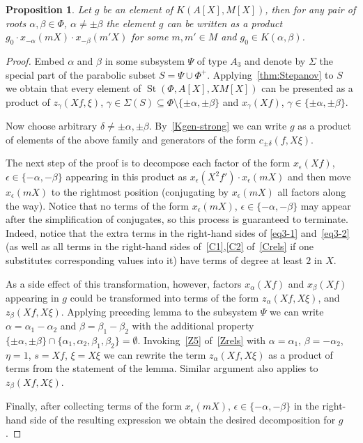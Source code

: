 \documentclass[oneside, 8pt]{amsart}
\newtheorem{prop}{Proposition}
\theoremstyle{remark}
\theoremstyle{definition}
\DeclareMathOperator{\St}{St}
\numberwithin{equation}{section}
\begin{document}
\begin{prop} \label{K-a-b}
 Let $g$ be an element of $K(A[X], M[X])$, then for any pair of roots $\alpha, \beta \in \Phi$, $\alpha \neq \pm \beta$
 the element $g$ can be written as a product $g_0 \cdot x_{-\alpha}(mX) \cdot x_{-\beta}(m'X)$ for some $m, m' \in M$ and $g_0 \in K(\alpha, \beta)$.
\end{prop}
\begin{proof}
 Embed $\alpha$ and $\beta$ in some subsystem $\Psi$ of type $A_3$ and denote by $\Sigma$ the special part of the parabolic subset $S = \Psi \cup \Phi^+$.
 Applying~\cref{thm:Stepanov} to $S$ we obtain that every element of $\St(\Phi, A[X], XM[X])$ can be presented as a product of 
  $z_\gamma(Xf, \xi)$, $\gamma \in \Sigma(S) \subseteq \Phi\setminus \{ \pm \alpha, \pm \beta \}$ and $x_\gamma(Xf)$, $\gamma \in \{ \pm \alpha, \pm \beta \}$.
 
 Now choose arbitrary $\delta \neq \pm \alpha, \pm \beta$. By~\cref{Kgen-strong} we can write $g$ as a product of elements of the above family and
  generators of the form $c_{\pm \delta}(f, X\xi)$.
  
 The next step of the proof is to decompose each factor of the form $x_{\epsilon}(Xf)$, $\epsilon \in \{-\alpha,-\beta\}$ appearing in this product as
 $x_{\epsilon}(X^2f') \cdot x_{\epsilon}(mX)$ and then move $x_{\epsilon}(mX)$ to the rightmost position
  (conjugating by $x_{\epsilon}(mX)$ all factors along the way).
 Notice that no terms of the form $x_{\epsilon}(mX)$, $\epsilon \in \{ -\alpha, -\beta \}$ may appear after the simplification of conjugates,
  so this process is guaranteed to terminate.
 Indeed, notice that the extra terms in the right-hand sides of \eqref{eq3-1} and~\eqref{eq3-2} 
 (as well as all terms in the right-hand sides of~\eqref{C1},\eqref{C2} of~\cref{Crels} if one substitutes corresponding values into it)
  have terms of degree at least $2$ in $X$. 
  
 As a side effect of this transformation, however, factors $x_\alpha(Xf)$ and $x_\beta(Xf)$ appearing in $g$ could be transformed into terms of the form
   $z_\alpha(Xf, X\xi)$, and $z_\beta(Xf, X\xi)$. Applying preceding lemma to the subsystem $\Psi$ we can write $\alpha = \alpha_1 - \alpha_2$ and 
    $\beta = \beta_1 - \beta_2$ with the additional property $\{ \pm \alpha, \pm \beta \} \cap \{ \alpha_1, \alpha_2, \beta_1, \beta_2 \} = \emptyset$.
 Invoking~\eqref{Z5} of~\cref{Zrels} with $\alpha = \alpha_1$, $\beta = -\alpha_2$, $\eta = 1$, $s = Xf$, $\xi = X\xi$ we can rewrite the term
  $z_\alpha(Xf, X\xi)$ as a product of terms from the statement of the lemma. Similar argument also applies to $z_\beta(Xf, X\xi)$.  
 
 Finally, after collecting terms of the form $x_\epsilon(mX)$, $\epsilon \in \{ -\alpha, -\beta \}$ in the right-hand side of the resulting expression
  we obtain the desired decomposition for $g$. \end{proof}
  
\end{document}
